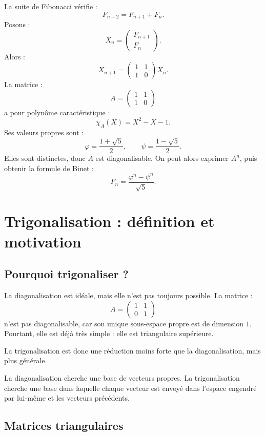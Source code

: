 \documentclass[11pt,a4paper]{article}
\begin{document}
La suite de Fibonacci vérifie :
\[
F_{n+2}=F_{n+1}+F_n.
\]
Posons :
\[
X_n=
\begin{pmatrix}
F_{n+1}\\
F_n
\end{pmatrix}.
\]
Alors :
\[
X_{n+1}
=
\begin{pmatrix}
1&1\\
1&0
\end{pmatrix}
X_n.
\]
La matrice :
\[
A=
\begin{pmatrix}
1&1\\
1&0
\end{pmatrix}
\]
a pour polynôme caractéristique :
\[
\chi_A(X)=X^2-X-1.
\]
Ses valeurs propres sont :
\[
\varphi=\frac{1+\sqrt5}{2},
\qquad
\psi=\frac{1-\sqrt5}{2}.
\]
Elles sont distinctes, donc \(A\) est diagonalisable.  
On peut alors exprimer \(A^n\), puis obtenir la formule de Binet :
\[
F_n=\frac{\varphi^n-\psi^n}{\sqrt5}.
\]

\section{Trigonalisation : définition et motivation}

\subsection{Pourquoi trigonaliser ?}

La diagonalisation est idéale, mais elle n'est pas toujours possible.  
La matrice :
\[
A=
\begin{pmatrix}
1&1\\
0&1
\end{pmatrix}
\]
n'est pas diagonalisable, car son unique sous-espace propre est de dimension \(1\).  
Pourtant, elle est déjà très simple : elle est triangulaire supérieure.

La trigonalisation est donc une réduction moins forte que la diagonalisation, mais plus générale.

\begin{retenirbox}
La diagonalisation cherche une base de vecteurs propres.  
La trigonalisation cherche une base dans laquelle chaque vecteur est envoyé dans l'espace engendré par lui-même et les vecteurs précédents.
\end{retenirbox}

\subsection{Matrices triangulaires}
\end{document}

